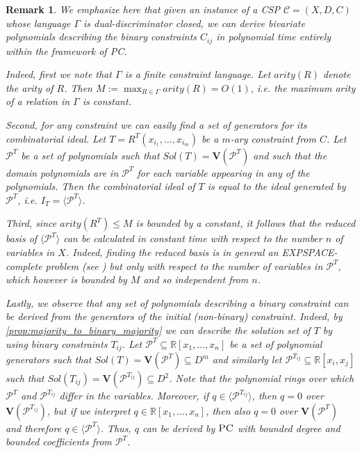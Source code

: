 \documentclass[11pt]{article}
\newcommand{\mon}[1]{\textcolor{magenta}{\textbf{Mon:} #1}}
\newcommand{\Cc}{\mathcal{C}}
\newcommand{\PC}{\textsc{PC}}
\newcommand{\Variety}[1]{{\textbf{V}}\left( #1 \right)}
\newcommand{\1}{\textbf{1}}
\newcommand{\GB}{\text{Gr\"{o}bner} }
\newtheorem{remark}[theorem]{Remark}
\begin{document}
\begin{remark} \label{rmrk:binary_constraints_bounded_derivations} 
    We emphasize here that given an instance of a CSP $\Cc = (X,D,C)$ whose language $\Gamma$ is dual-discriminator closed, we can derive bivariate polynomials describing the binary constraints $C_{ij}$ in polynomial time entirely within the framework of \PC. 
    
    Indeed, first we note that $\Gamma$ is a \emph{finite} constraint language. Let $arity(R)$ denote the arity of $R$. Then $M := \max_{R \in \Gamma} arity(R) = O(1)$, i.e. the maximum arity of a relation in $\Gamma$ is constant. 
    
    Second, for any constraint we can easily find a set of generators for its combinatorial ideal. Let $T = R^{T}(x_{i_1}, \ldots, x_{i_m})$ be a $m$-ary constraint from $C$. Let $\mathcal{P}^{T}$ be a set of polynomials such that $Sol(T) = \Variety{\mathcal{P}^{T}}$ and such that the domain polynomials are in $\mathcal{P}^{T}$ for each variable appearing in any of the polynomials. Then the combinatorial ideal of $T$ is equal to the ideal generated by $\mathcal{P}^{T}$, i.e. $I_T = \langle \mathcal{P}^{T} \rangle$. 
    
    Third, since $arity(R^{T}) \leq M$ is bounded by a constant, it follows that the reduced \GB basis of $\langle \mathcal{P}^{T} \rangle$ can be calculated in constant time with respect to the number $n$ of variables in $X$. Indeed, finding the reduced \GB basis is in general an EXPSPACE-complete problem (see \cite{MAYR1982305, Mayr1989}) but only with respect to the number of variables in $\mathcal{P}^{T}$, which however is bounded by $M$ and so independent from $n$.

    Lastly, we observe that any set of polynomials describing a binary constraint can be derived from the generators of the initial (non-binary) constraint. Indeed, by \cref{prop:majority_to_binary_majority} we can describe the solution set of $T$ by using binary constraints $T_{ij}$. Let $\mathcal{P}^{T} \subseteq \mathbb{R}[x_1, \dots, x_n]$ be a set of polynomial generators such that $Sol(T) = \Variety{\mathcal{P}^{T}} \subseteq D^m$ and similarly let $\mathcal{P}^{T_{ij}} \subseteq \mathbb{R}[x_i,x_j]$ such that $Sol(T_{ij}) = \Variety{\mathcal{P}^{T_{ij}}} \subseteq D^2$. Note that the polynomial rings over which $\mathcal{P}^{T}$ and $\mathcal{P}^{T_{ij}}$ differ in the variables. Moreover, if $q \in \langle \mathcal{P}^{T_{ij}} \rangle$, then $q = 0$ over $\Variety{\mathcal{P}^{T_{ij}}}$, but if we interpret $q \in \mathbb{R}[x_1, \dots, x_n]$, then also $q = 0$ over $\Variety{\mathcal{P}^{T}}$ and therefore $q \in \langle \mathcal{P}^{T} \rangle$. Thus, $q$ can be derived by $\PC$ with bounded degree and bounded coefficients from $\mathcal{P}^{T}$.


\end{remark}
\end{document}
